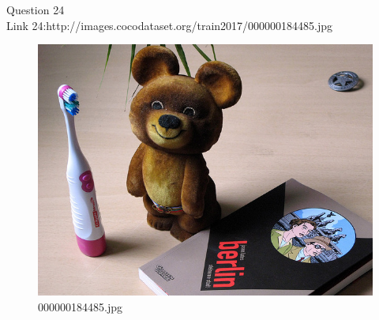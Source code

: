 Question 24\\
Link 24:http://images.cocodataset.org/train2017/000000184485.jpg
    \begin{figure}[h]
        \centering
        \includegraphics[width=0.8\linewidth]{../image set/easy/000000184485.jpg}
        \caption{000000184485.jpg}
    \end{figure}
